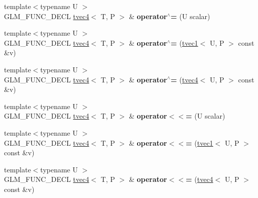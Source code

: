 \begin{DoxyCompactItemize}
\item 
\hypertarget{structglm_1_1tvec4_a4e3c9f658334363b354a9d6865ad35d7}{{\footnotesize template$<$typename U $>$ }\\G\-L\-M\-\_\-\-F\-U\-N\-C\-\_\-\-D\-E\-C\-L \hyperlink{structglm_1_1tvec4}{tvec4}$<$ T, P $>$ \& {\bfseries operator$^\wedge$=} (U scalar)}\label{structglm_1_1tvec4_a4e3c9f658334363b354a9d6865ad35d7}

\item 
\hypertarget{structglm_1_1tvec4_a44b9249aabc9ae280d826ffe16b4b0dc}{{\footnotesize template$<$typename U $>$ }\\G\-L\-M\-\_\-\-F\-U\-N\-C\-\_\-\-D\-E\-C\-L \hyperlink{structglm_1_1tvec4}{tvec4}$<$ T, P $>$ \& {\bfseries operator$^\wedge$=} (\hyperlink{structglm_1_1tvec1}{tvec1}$<$ U, P $>$ const \&v)}\label{structglm_1_1tvec4_a44b9249aabc9ae280d826ffe16b4b0dc}

\item 
\hypertarget{structglm_1_1tvec4_a9945b7771ada85b3324781679d9282f5}{{\footnotesize template$<$typename U $>$ }\\G\-L\-M\-\_\-\-F\-U\-N\-C\-\_\-\-D\-E\-C\-L \hyperlink{structglm_1_1tvec4}{tvec4}$<$ T, P $>$ \& {\bfseries operator$^\wedge$=} (\hyperlink{structglm_1_1tvec4}{tvec4}$<$ U, P $>$ const \&v)}\label{structglm_1_1tvec4_a9945b7771ada85b3324781679d9282f5}

\item 
\hypertarget{structglm_1_1tvec4_a7896c5f2fbb9692e18f145fef2482677}{{\footnotesize template$<$typename U $>$ }\\G\-L\-M\-\_\-\-F\-U\-N\-C\-\_\-\-D\-E\-C\-L \hyperlink{structglm_1_1tvec4}{tvec4}$<$ T, P $>$ \& {\bfseries operator$<$$<$=} (U scalar)}\label{structglm_1_1tvec4_a7896c5f2fbb9692e18f145fef2482677}

\item 
\hypertarget{structglm_1_1tvec4_a499b2a24166487f91833e1f6b19aa972}{{\footnotesize template$<$typename U $>$ }\\G\-L\-M\-\_\-\-F\-U\-N\-C\-\_\-\-D\-E\-C\-L \hyperlink{structglm_1_1tvec4}{tvec4}$<$ T, P $>$ \& {\bfseries operator$<$$<$=} (\hyperlink{structglm_1_1tvec1}{tvec1}$<$ U, P $>$ const \&v)}\label{structglm_1_1tvec4_a499b2a24166487f91833e1f6b19aa972}

\item 
\hypertarget{structglm_1_1tvec4_ae46c24a5c1f5c2bcbcb9f4d9c767778e}{{\footnotesize template$<$typename U $>$ }\\G\-L\-M\-\_\-\-F\-U\-N\-C\-\_\-\-D\-E\-C\-L \hyperlink{structglm_1_1tvec4}{tvec4}$<$ T, P $>$ \& {\bfseries operator$<$$<$=} (\hyperlink{structglm_1_1tvec4}{tvec4}$<$ U, P $>$ const \&v)}\label{structglm_1_1tvec4_ae46c24a5c1f5c2bcbcb9f4d9c767778e}


\end{DoxyCompactItemize}
